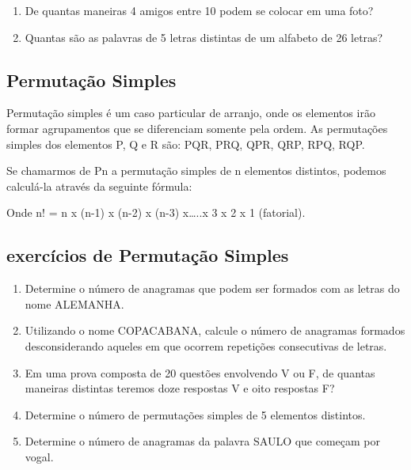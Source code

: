 \begin{multicols*}{2}
\begin{enumerate}
		\item De quantas maneiras 4 amigos entre 10 podem se colocar em uma foto?

		\item Quantas são as palavras de 5 letras distintas de um alfabeto de 26 letras?

	\end{enumerate}

	\subsection{Permutação Simples}

	Permutação simples é um caso particular de arranjo, onde os elementos irão formar agrupamentos que se diferenciam somente pela ordem. As permutações simples dos elementos P, Q e R são: PQR, PRQ, QPR, QRP, RPQ, RQP.

	Se chamarmos de Pn a permutação simples de n elementos distintos, podemos calculá-la através da seguinte fórmula:


	Onde n! = n x (n-1) x (n-2)  x (n-3) x…..x 3 x 2 x 1 (fatorial).

	\subsection{exercícios de Permutação Simples}

	\begin{enumerate}

		\item Determine o número de anagramas que podem ser formados com as letras do nome ALEMANHA.

		\item Utilizando o nome COPACABANA, calcule o número de anagramas formados desconsiderando aqueles em que ocorrem repetições consecutivas de letras.

		\item Em uma prova composta de 20 questões envolvendo V ou F, de quantas maneiras distintas teremos doze respostas V e oito respostas F?

		\item Determine o número de permutações simples de 5 elementos distintos.

		\item Determine o número de anagramas da palavra SAULO que começam por vogal.

	\end{enumerate}


\end{multicols*}
